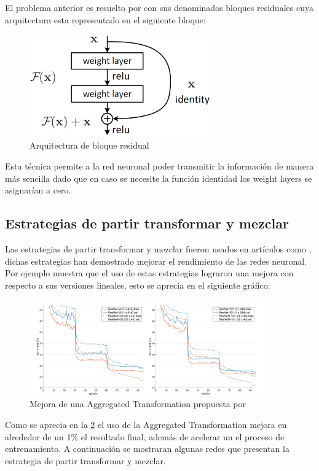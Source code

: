 El problema anterior es resuelto por \cite{Ruder2016} con sus denominados bloques residuales cuya arquitectura esta representado en el siguiente bloque:

\begin{figure}[H]
    \centering
    \includegraphics[width =0.7\textwidth]{images/resnet.png}
    \caption{Arquitectura de bloque residual}
    \label{fig:my_label}
\end{figure}


Esta técnica permite a la red neuronal poder transmitir la información de manera más sencilla dado que en caso se necesite la función identidad  los weight layers se asignarían a cero.    
\subsection{Estrategias de partir transformar y mezclar}
Las estrategias de partir transformar y mezclar fueron usados en artículos como \cite{Xie2017, Szegedy2015}, dichas estrategias han demostrado mejorar el rendimiento de las redes neuronal. Por ejemplo \cite{Xie2017} muestra que el uso de estas estrategias lograron una mejora con respecto a sus versiones lineales, esto se aprecia en el siguiente gráfico:
\begin{figure}[H]
    \centering
    \includegraphics[width=0.9\textwidth]{images/group/resnextMejora.png}
    \caption{Mejora de una Aggregated Transformation propuesta por \cite{Xie2017}}
    \label{fig:mejoraRestnext}
\end{figure}{}
Como se aprecia en la \figurename\ref{fig:mejoraRestnext} el uso de la Aggregated Transformation mejora en alrededor de un 1\% el resultado final, además de acelerar un el proceso de entrenamiento. A continuación se mostraran algunas redes que presentan la estrategia  de partir transformar y mezclar. 
